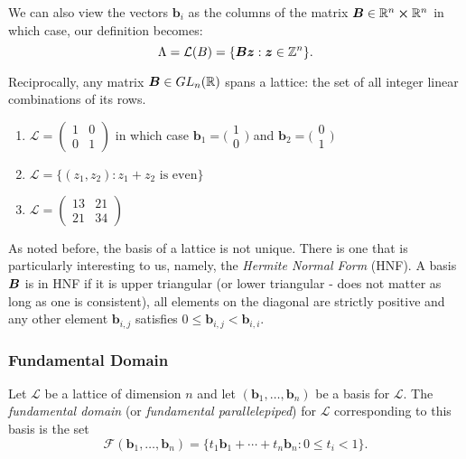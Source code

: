 \begin{remark}
    We can also view the vectors $\bm{b}_i$ as the columns of the matrix $\boldsymbol{B} \in \mathbb{R}^n \cross \mathbb{R}^n$ in which case, our definition becomes:
    $$\Lambda = \mathcal{L}(B) = \{\boldsymbol{Bz} :  \boldsymbol{z} \in \mathbb{Z}^n \}.$$
\end{remark}

Reciprocally, any matrix $\boldsymbol{B} \in GL_n(\mathbb{R})$ spans a lattice: the set of all integer linear combinations of its rows.

\begin{example}
\begin{enumerate}
    \item $\mathcal{L} = \begin{pmatrix}
        1 & 0\\
        0 & 1
	\end{pmatrix}$ in which case $\bm{b}_1 = \big(\begin{smallmatrix}
          1\\
          0
	\end{smallmatrix}\big)$ and $\bm{b}_2 = \big(\begin{smallmatrix}
          0\\
          1
        \end{smallmatrix}\big)$
    \item $\mathcal{L} = \{(z_1,z_2) : z_1 + z_2 \text{ is even}\}$
    \item $\mathcal{L} = \begin{pmatrix}
        13 & 21\\
        21 & 34
        \end{pmatrix}$
\end{enumerate}
\end{example}

As noted before, the basis of a lattice is not unique. There is one that is particularly interesting to us, namely, the \textit{Hermite Normal Form} (HNF). A basis $\boldsymbol{B}$ is in HNF if it is upper triangular (or lower triangular - does not matter as long as one is consistent), all elements on the diagonal are strictly positive and any other element $\bm{b}_{i,j}$ satisfies $0 \leq \bm{b}_{i,j} < \bm{b}_{i,i}$.

\subsubsection*{Fundamental Domain}
\begin{definition} \label{fundamental}
    Let $\mathcal{L}$ be a lattice of dimension $n$ and let $(\bm{b}_1, \dots, \bm{b}_n)$ be a basis for $\mathcal{L}$. The \textit{fundamental domain} (or \textit{fundamental parallelepiped}) for $\mathcal{L}$ corresponding to this basis is the set
    $$ \mathcal{F}(\bm{b}_1, \dots, \bm{b}_n) = \{t_1\bm{b}_1 + \cdots + t_n\bm{b}_n : 0 \leq t_i < 1 \}.$$
\end{definition}


